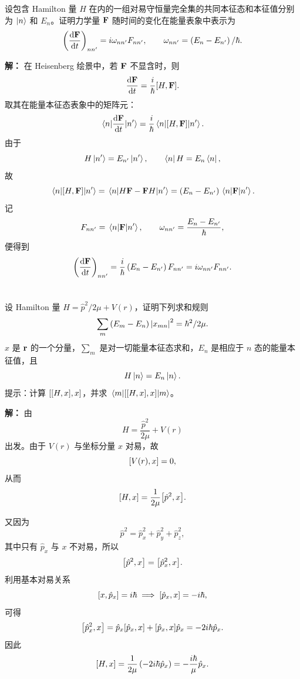 \documentclass[12pt,a4paper]{article}
\begin{document}
\section{}

设包含 Hamilton 量 $H$ 在内的一组对易守恒量完全集的共同本征态和本征值分别为 $\ket{n}$ 和 $E_n$。证明力学量 $\vb{F}$ 随时间的变化在能量表象中表示为
\[
\left(\dv{\vb{F}}{t}\right)_{nn'}=i\omega_{nn'}F_{nn'},\qquad
\omega_{nn'}=\left(E_n-E_{n'}\right)/\hbar.
\]

\vspace{0.5cm}
\noindent\textbf{解：}
在 Heisenberg 绘景中，若 $\vb{F}$ 不显含时，则
\[
\dv{\vb{F}}{t}=\frac{i}{\hbar}\comm{H}{\vb{F}}.
\]
取其在能量本征态表象中的矩阵元：
\[
\matrixel{n}{\dv{\vb{F}}{t}}{n'}
=\frac{i}{\hbar}\matrixel{n}{\comm{H}{\vb{F}}}{n'}.
\]
由于
\[
H\ket{n'}=E_{n'}\ket{n'},\qquad \bra{n}H=E_n\bra{n},
\]
故
\[
\matrixel{n}{\comm{H}{\vb{F}}}{n'}
=\matrixel{n}{H\vb{F}-\vb{F}H}{n'}
=\left( E_n-E_{n'} \right)\matrixel{n}{\vb{F}}{n'}.
\]
记
\[
F_{nn'}=\matrixel{n}{\vb{F}}{n'},\qquad \omega_{nn'}=\frac{E_n-E_{n'}}{\hbar},
\]
便得到
\[
\left( \dv{\vb{F}}{t} \right)_{nn'}
=\frac{i}{\hbar}\left( E_n-E_{n'} \right)F_{nn'}
=i\omega_{nn'}F_{nn'}.
\]

\section{}

设 Hamilton 量 $H=\hat{p}^2/2\mu+V(r)$，证明下列求和规则
\[
\sum_m \left(E_m-E_n\right)\abs{x_{mn}}^2=\hbar^2/2\mu.
\]
$x$ 是 $\vb{r}$ 的一个分量，$\sum_m$ 是对一切能量本征态求和，$E_n$ 是相应于 $n$ 态的能量本征值，且
\[
H\ket{n}=E_n\ket{n}.
\]
提示：计算 $\comm{\comm{H}{x}}{x}$，并求 $\matrixel{m}{\comm{\comm{H}{x}}{x}}{m}$。

\vspace{0.5cm}
\noindent\textbf{解：}
由
\[
H=\frac{\hat p^2}{2\mu}+V(r)
\]
出发。由于 \(V(r)\) 与坐标分量 \(x\) 对易，故
\[
\comm{V(r)}{x}=0,
\]
从而
\[
\comm{H}{x}=\frac{1}{2\mu}\comm{\hat p^2}{x}.
\]

又因为
\[
\hat p^2=\hat p_x^2+\hat p_y^2+\hat p_z^2,
\]
其中只有 \(\hat p_x\) 与 \(x\) 不对易，所以
\[
\comm{\hat p^2}{x}=\comm{\hat p_x^2}{x}.
\]
利用基本对易关系
\[
\comm{x}{\hat p_x}=i\hbar
\implies
\comm{\hat p_x}{x}=-i\hbar,
\]
可得
\[
\comm{\hat p_x^2}{x}
=\hat p_x\comm{\hat p_x}{x}+\comm{\hat p_x}{x}\hat p_x
=-2i\hbar \hat p_x.
\]
因此
\[
\comm{H}{x}
=\frac{1}{2\mu}\left(-2i\hbar \hat p_x\right)
=-\frac{i\hbar}{\mu}\hat p_x.
\]
\end{document}
